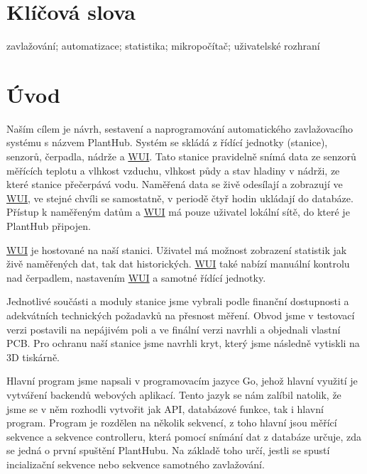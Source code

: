 \documentclass[czech,12pt,a4paper]{article}
\begin{document}
\section*{Klíčová slova}

\noindent zavlažování; automatizace; statistika; mikropočítač; uživatelské rozhraní

\clearpage

\tableofcontents

\clearpage

\section{Úvod} \label{secUvod}

Naším cílem je návrh, sestavení a naprogramování automatického zavlažovacího systému s názvem PlantHub. Systém se skládá z řídící jednotky (stanice), senzorů, čerpadla, nádrže a \space \underline{\ac{WUI}}. Tato stanice pravidelně snímá data ze senzorů měřících teplotu a vlhkost vzduchu, vlhkost půdy a stav hladiny v nádrži, ze které stanice přečerpává vodu. Naměřená data se živě odesílají a zobrazují ve \underline{\ac{WUI}}, ve stejné chvíli se samostatně, v periodě čtyř hodin ukládají do databáze. Přístup k naměřeným datům a \underline{\ac{WUI}} má pouze uživatel lokální sítě, do které je PlantHub připojen.

\underline{\ac{WUI}} je hostované na naší stanici. Uživatel má možnost zobrazení statistik jak živě naměřených dat, tak dat historických. \underline{\ac{WUI}} také nabízí manuální kontrolu nad čerpadlem, nastavením \underline{\ac{WUI}} a samotné řídící jednotky.

Jednotlivé součásti a moduly stanice jsme vybrali podle finanční dostupnosti a adekvátních technických požadavků na přesnost měření. Obvod jsme v testovací verzi postavili na nepájivém poli a ve finální verzi navrhli a objednali vlastní \ac{PCB}. Pro ochranu naší stanice jsme navrhli kryt, který jsme následně vytiskli na 3D tiskárně.

Hlavní program jsme napsali v programovacím jazyce Go, jehož hlavní využití je vytváření backendů webových aplikací. Tento jazyk se nám zalíbil natolik, že jsme se v něm rozhodli vytvořit jak \ac{API}, databázové funkce, tak i hlavní program. Program je rozdělen na několik sekvencí, z toho hlavní jsou měřící sekvence a sekvence controlleru, která pomocí snímání dat z databáze určuje, zda se jedná o první spuštění PlantHubu. Na základě toho určí, jestli se spustí incializační sekvence nebo sekvence samotného zavlažování.
\end{document}
